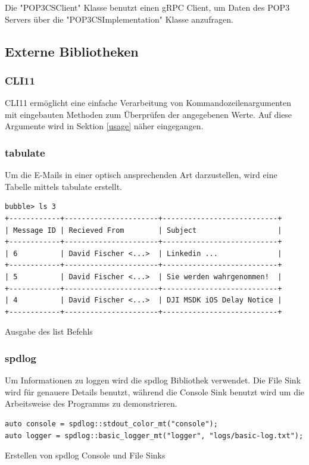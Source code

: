 \documentclass[12pt, letterpaper]{article}
\newenvironment{code}{\captionsetup{type=listing}}{}
\begin{document}
Die "POP3CSClient" Klasse benutzt einen gRPC Client, um Daten des POP3 Servers über die "POP3CSImplementation" Klasse anzufragen.

\subsection{Externe Bibliotheken}
\label{extBib}

\subsubsection{CLI11}
CLI11\cite{cli11_ref} ermöglicht eine einfache Verarbeitung von Kommandozeilenargumenten mit eingebauten Methoden zum Überprüfen der angegebenen Werte. Auf diese Argumente wird in Sektion \ref{usage} näher eingegangen.

\subsubsection{tabulate}
Um die E-Mails in einer optisch ansprechenden Art darzustellen, wird eine Tabelle mittels tabulate\cite{tabulate_ref} erstellt.

\begin{code}
  \begin{verbatim}
bubble> ls 3
+------------+----------------------+---------------------------+
| Message ID | Recieved From        | Subject                   | 
+------------+----------------------+---------------------------+
| 6          | David Fischer <...>  | Linkedin ...              | 
+------------+----------------------+---------------------------+
| 5          | David Fischer <...>  | Sie werden wahrgenommen!  |
+------------+----------------------+---------------------------+
| 4          | David Fischer <...>  | DJI MSDK iOS Delay Notice |
+------------+----------------------+---------------------------+
  \end{verbatim}
  \caption{Ausgabe des list Befehls}
\end{code}

\subsubsection{spdlog}
Um Informationen zu loggen wird die spdlog\cite{spdlog_ref} Bibliothek verwendet. Die File Sink wird für genauere Details benutzt, während die Console Sink benutzt wird um die Arbeitsweise des Programms zu demonstrieren.

\begin{code}
\begin{verbatim}
auto console = spdlog::stdout_color_mt("console");
auto logger = spdlog::basic_logger_mt("logger", "logs/basic-log.txt");
\end{verbatim}
\caption{Erstellen von spdlog Console und File Sinks}
\label{spdlog_code}
\end{code}
\end{document}
